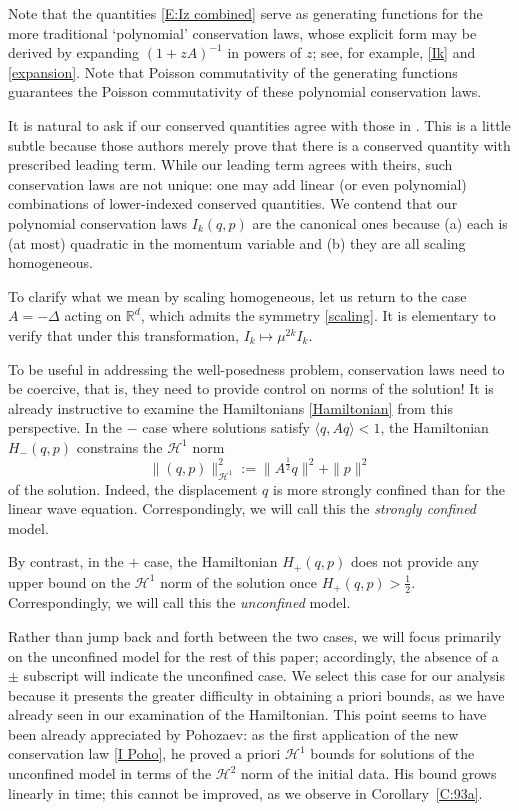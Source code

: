 \documentclass{amsart}
\newcommand{\R}{{\mathbb{R}}}
\theoremstyle{definition}
\numberwithin{equation}{section}
\renewcommand{\H}{\mathcal H}
\newcommand{\la}{\langle}
\newcommand{\ra}{\rangle}
\begin{document}
Note that the quantities \eqref{E:Iz combined} serve as generating functions for the more traditional `polynomial' conservation laws, whose explicit form may be derived by expanding $(1+zA)^{-1}$ in powers of $z$; see, for example, \eqref{Ik} and \eqref{expansion}.  Note that Poisson commutativity of the generating functions guarantees the Poisson commutativity of these polynomial conservation laws.

It is natural to ask if our conserved quantities agree with those in \cite{BM26}.  This is a little subtle because those authors merely prove that there is a conserved quantity with prescribed leading term.  While our leading term agrees with theirs, such conservation laws are not unique: one may add linear (or even polynomial) combinations of lower-indexed conserved quantities.  We contend that our polynomial conservation laws $I_k(q,p)$ are the canonical ones because (a) each is (at most) quadratic in the momentum variable and (b) they are all scaling homogeneous.

To clarify what we mean by scaling homogeneous, let us return to the case $A=-\Delta$ acting on $\R^d$, which admits the symmetry \eqref{scaling}.  It is elementary to verify that under this transformation, $I_k \mapsto \mu^{2k} I_k$.

To be useful in addressing the well-posedness problem, conservation laws need to be coercive, that is, they need to provide control on norms of the solution!  It is already instructive to examine the Hamiltonians \eqref{Hamiltonian} from this perspective.  In the $-$ case where solutions satisfy $\la q, Aq\ra<1$, the Hamiltonian $H_-(q,p)$ constrains the $\H^1$ norm
$$
\|(q,p)\|_{\H^1}^2:= \|A^{\frac12}q\|^2 + \|p\|^2
$$
of the solution. Indeed, the displacement $q$ is more strongly confined than for the linear wave equation. Correspondingly, we will call this the \emph{strongly confined} model.  

By contrast, in the $+$ case, the Hamiltonian $H_+(q,p)$ does not provide any upper bound on the $\H^1$ norm of the solution once $H_+(q,p)>\frac12$. Correspondingly, we will call this the \emph{unconfined} model.


Rather than jump back and forth between the two cases, we will focus primarily on the unconfined model for the rest of this paper; accordingly, the absence of a $\pm$ subscript will indicate the unconfined case.  We select this case for our analysis because it presents the greater difficulty in obtaining a priori bounds, as we have already seen in our examination of the Hamiltonian.  This point seems to have been already appreciated by Pohozaev: as the first application of the new conservation law \eqref{I Poho}, he proved a priori $\H^1$ bounds for solutions of the unconfined model in terms of the $\H^2$ norm of the initial data.  His bound grows linearly in time; this cannot be improved, as we observe in Corollary~\ref{C:93a}.
\end{document}
